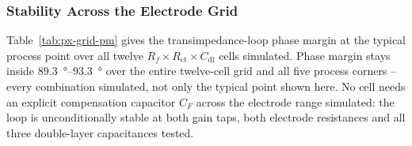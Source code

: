 %

\subsubsection{Stability Across the Electrode Grid}\label{sss:pixel-grid}

Table~\ref{tab:px-grid-pm} gives the transimpedance-loop phase margin at the
typical process point over all twelve $R_f\times R_{\mathrm{ct}}\times
C_{\mathrm{dl}}$ cells simulated. Phase margin stays inside
\SIrange{89.3}{93.3}{\degree} over the entire twelve-cell grid and all five
process corners -- every combination simulated, not only the typical point
shown here. No cell needs an explicit compensation capacitor $C_F$ across the
electrode range simulated: the loop is unconditionally stable at both gain
taps, both electrode resistances and all three double-layer capacitances
tested.
